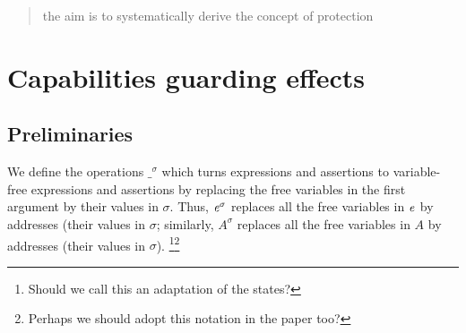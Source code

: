 \documentclass[acmsmall,review,anonymous,screen]{acmart}\settopmatter{printfolios=true,printacmref=false}
\begin{document}


\newcommand{\ExtCallsOn}[1]{ {\mathcal E}\!\mathit{xt}{\mathcal C}\!\mathit{ll}{\mathcal O\!}\mathit{n}(#1)}
\newcommand{\callsOn}[1] {{\ensuremath{\mathcal C}\!{\mathit{lld}}(#1)}}
\newcommand{\enrich}[1] {{\ensuremath{#1}^{enrch}}}
\newcommand{\as}[2]{#1^{#2}}
\newcommand{\preserve}[1]{\oopenBr\, #1\ccloseBr}

\newcommand{\Guards}[2]{{\mathcal G}\!\mathit{uards}( {#1}, {#2})}


\begin{abstract}

the aim is to systematically derive the concept of protection
\end{abstract}

\maketitle 

\section{Capabilities guarding effects}

\subsection{Preliminaries}

We define the operations $\as {\_} {\sigma}$ which turns expressions and assertions to variable-free expressions and assertions by 
replacing  the free variables in the first argument by their values in $\sigma$.
Thus,
 $\as {\re} {\sigma}$  replaces all the free variables in $\mathit{e}$ by addresses (their values in $\sigma$; similarly,
  $\as {A} {\sigma}$  replaces all the free variables in $A$ by addresses (their values in $\sigma$).
 \footnote{Should we call this an adaptation of the states?}\footnote{Perhaps we should adopt this notation in the paper too?}
\end{document}

